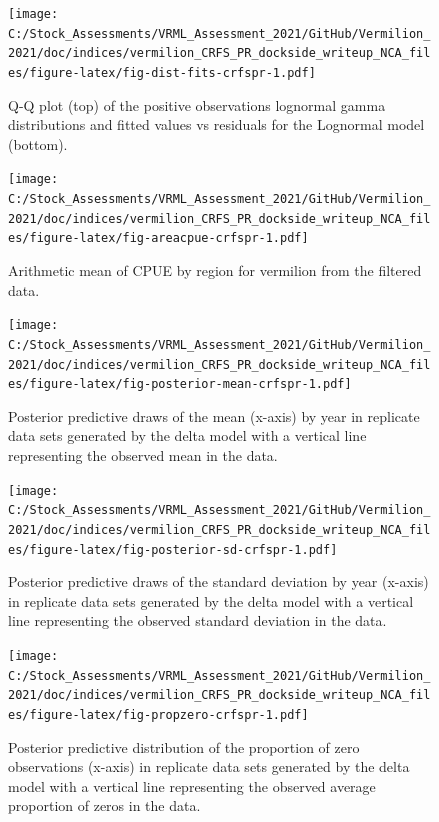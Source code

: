 \documentclass[11pt,
  english,
]{article}
\begin{document}
\FloatBarrier

\begin{figure}
\centering
\texttt{[image: C:/Stock\_Assessments/VRML\_Assessment\_2021/GitHub/Vermilion\_2021/doc/indices/vermilion\_CRFS\_PR\_dockside\_writeup\_NCA\_files/figure-latex/fig-dist-fits-crfspr-1.pdf]}
\caption{\label{fig:fig-dist-fits-crfspr}Q-Q plot (top) of the positive observations lognormal gamma distributions and fitted values vs residuals for the Lognormal model (bottom).}
\end{figure}

\begin{figure}
\centering
\texttt{[image: C:/Stock\_Assessments/VRML\_Assessment\_2021/GitHub/Vermilion\_2021/doc/indices/vermilion\_CRFS\_PR\_dockside\_writeup\_NCA\_files/figure-latex/fig-areacpue-crfspr-1.pdf]}
\caption{\label{fig:fig-areacpue-crfspr}Arithmetic mean of CPUE by region for vermilion from the filtered data.}
\end{figure}

\begin{figure}
\centering
\texttt{[image: C:/Stock\_Assessments/VRML\_Assessment\_2021/GitHub/Vermilion\_2021/doc/indices/vermilion\_CRFS\_PR\_dockside\_writeup\_NCA\_files/figure-latex/fig-posterior-mean-crfspr-1.pdf]}
\caption{\label{fig:fig-posterior-mean-crfspr}Posterior predictive draws of the mean (x-axis) by year in replicate data sets generated by the delta model with a vertical line representing the observed mean in the data.}
\end{figure}

\FloatBarrier

\begin{figure}
\centering
\texttt{[image: C:/Stock\_Assessments/VRML\_Assessment\_2021/GitHub/Vermilion\_2021/doc/indices/vermilion\_CRFS\_PR\_dockside\_writeup\_NCA\_files/figure-latex/fig-posterior-sd-crfspr-1.pdf]}
\caption{\label{fig:fig-posterior-sd-crfspr}Posterior predictive draws of the standard deviation by year (x-axis) in replicate data sets generated by the delta model with a vertical line representing the observed standard deviation in the data.}
\end{figure}

\begin{figure}
\centering
\texttt{[image: C:/Stock\_Assessments/VRML\_Assessment\_2021/GitHub/Vermilion\_2021/doc/indices/vermilion\_CRFS\_PR\_dockside\_writeup\_NCA\_files/figure-latex/fig-propzero-crfspr-1.pdf]}
\caption{\label{fig:fig-propzero-crfspr}Posterior predictive distribution of the proportion of zero observations (x-axis) in replicate data sets generated by the delta model with a vertical line representing the observed average proportion of zeros in the data.}
\end{figure}
\end{document}
